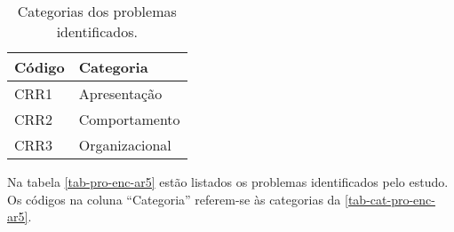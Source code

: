 \begin{table}[htb]
  \begin{center}
    \ABNTEXfontereduzida
    \caption{Categorias dos problemas identificados.}
    \label{tab-cat-pro-enc-ar5}
    \begin{tabular}{p{2.0cm}|p{5.0cm}}
      \textbf{Código} & \textbf{Categoria} \\
      \hline
      CRR1            & Apresentação       \\
      \hline
      CRR2            & Comportamento      \\
      \hline
      CRR3            & Organizacional     \\
    \end{tabular}
  \end{center}
\end{table}

Na tabela \autoref{tab-pro-enc-ar5} estão listados os problemas identificados pelo estudo.
Os códigos na coluna ``Categoria'' referem-se às categorias da \autoref{tab-cat-pro-enc-ar5}.

